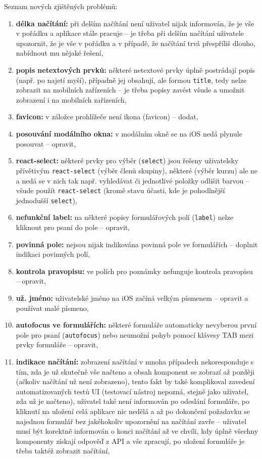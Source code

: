 Seznam nových zjištěných problémů:
\begin{enumerate}[label=\textbf{P\arabic*}]
    \item \label{P1} \textbf{délka načítání:} při delším načítání není uživatel nijak informován, že je vše v pořádku a aplikace stále pracuje -- je třeba při delším načítání uživatele upozornit, že je vše v pořádku a v případě, že načítání trvá přespříliš dlouho, nabídnout mu nějaké řešení,
    \item \label{P2} \textbf{popis netextových prvků:} některé netextové prvky úplně postrádají popis (např. po najetí myší), případně jej obsahují, ale formou \verb|title|, tedy nelze zobrazit na mobilních zařízeních -- je třeba popisy zavést všude a umožnit zobrazení i na mobilních zařízeních,
    \item \label{P3} \textbf{favicon:} v záložce prohlížeče není ikona (favicon) -- dodat,
    \item \label{P4} \textbf{posouvání modálního okna:} v modálním okně se na iOS nedá plynule posouvat -- opravit,
    \item \label{P5} \textbf{react-select:} některé prvky pro výběr (\verb|select|) jsou řešeny uživatelsky přívětivým \verb|react-select| (výběr členů skupiny), některé (výběr kurzu) ale ne a nedá se v nich tak např. vyhledávat či jednotlivé položky odlišit barvou -- všude použít \verb|react-select| (kromě stavu účasti, kde je pohodlnější jednodušší \verb|select|),
    \item \label{P6} \textbf{nefunkční label:} na některé popisy formulářových polí (\verb|label|) nelze kliknout pro psaní do pole -- opravit,
    \item \label{P7} \textbf{povinná pole:} nejsou nijak indikována povinná pole ve formulářích -- doplnit indikaci povinných polí,
    \item \label{P8} \textbf{kontrola pravopisu:} ve polích pro poznámky nefunguje kontrola pravopisu -- opravit,
    \item \label{P9} \textbf{už. jméno:} uživatelské jméno na iOS začíná velkým písmenem -- opravit a používat malé písmeno,
    \item \label{P10} \textbf{autofocus ve formulářích:} některé formuláře automaticky nevyberou první pole pro psaní (\verb|autofocus|) nebo neumožní pohyb pomocí klávesy TAB mezi prvky formuláře -- opravit,
    \item \label{P11} \textbf{indikace načítání:} zobrazení načítání v mnoha případech nekoresponduje s tím, zda je už skutečně vše načteno a obsah komponent se zobrazí až později (ačkoliv načítání už není zobrazeno), tento fakt by také komplikoval zavedení automatizovaných testů UI (testovací nástroj nepozná, stejně jako uživatel, zda už je načteno), uživatel také není informován po odeslání formuláře, po kliknutí na uložení celá aplikace nic nedělá a až po dokončení požadavku se najednou formulář bez jakéhokoliv upozornění na načítání zavře -- uživatel musí být korektně informován o konci načítání až ve chvíli, kdy úplně všechny komponenty získají odpověď z API a vše zpracují, po uložení formuláře je třeba taktéž zobrazit načítání,

\end{enumerate}
